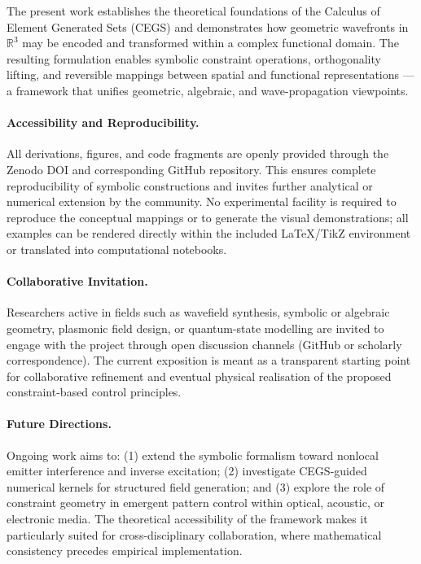 \documentclass[11pt]{article}
\theoremstyle{plain}
\theoremstyle{definition}
\theoremstyle{remark}
\begin{document}
The present work establishes the theoretical foundations of the Calculus of Element Generated Sets (CEGS) and demonstrates how geometric wavefronts in $\mathbb{R}^3$ may be encoded and transformed within a complex functional domain. The resulting formulation enables symbolic constraint operations, orthogonality lifting, and reversible mappings between spatial and functional representations — a framework that unifies geometric, algebraic, and wave-propagation viewpoints.

\paragraph{Accessibility and Reproducibility.}
All derivations, figures, and code fragments are openly provided through the Zenodo DOI and corresponding GitHub repository. This ensures complete reproducibility of symbolic constructions and invites further analytical or numerical extension by the community. No experimental facility is required to reproduce the conceptual mappings or to generate the visual demonstrations; all examples can be rendered directly within the included \LaTeX/TikZ environment or translated into computational notebooks.

\paragraph{Collaborative Invitation.}
Researchers active in fields such as wavefield synthesis, symbolic or algebraic geometry, plasmonic field design, or quantum-state modelling are invited to engage with the project through open discussion channels (GitHub or scholarly correspondence). The current exposition is meant as a transparent starting point for collaborative refinement and eventual physical realisation of the proposed constraint-based control principles.

\paragraph{Future Directions.}
Ongoing work aims to: 
(1) extend the symbolic formalism toward nonlocal emitter interference and inverse excitation; 
(2) investigate CEGS-guided numerical kernels for structured field generation; and 
(3) explore the role of constraint geometry in emergent pattern control within optical, acoustic, or electronic media. 
The theoretical accessibility of the framework makes it particularly suited for cross-disciplinary collaboration, where mathematical consistency precedes empirical implementation.
\end{document}
